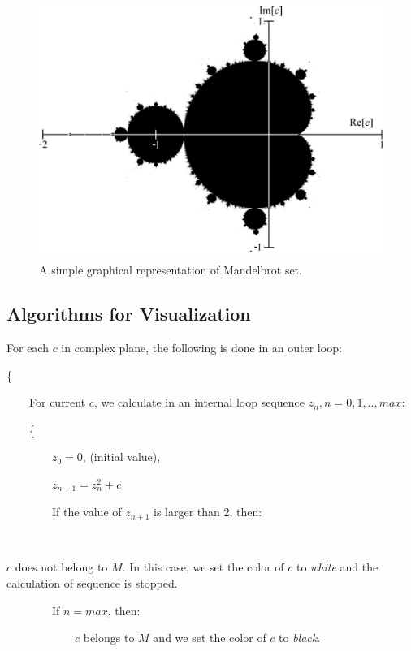 \begin{figure}[th]
\centering
\includegraphics[width=\textwidth,keepaspectratio]{Figures/Chapter2/mandelbrot.png}
\decoRule
\caption[Mandelbrot Set Graphical Presentation]{A simple graphical representation of Mandelbrot set.}
\label{fig:mandelbrot}
\end{figure}

\subsection*{Algorithms for Visualization}\label{chap2:algorithmsforvisualization}

For each $c$ in complex plane, the following is done in an outer loop:

\{

~~~~For current $c$, we calculate in an internal loop sequence $z_n, n = 0, 1, .., max$:

~~~~\{

~~~~~~~~$z_0 = 0$, (initial value),

~~~~~~~~$z_{n+1} = z_n^2 + c$

~~~~~~~~If the value of $z_{n+1}$ is larger than $2$, then:

~~~~~~~~~~~~\begin{minipage}[t]{0.9\textwidth} $c$ does not belong to $M$. In this case, we set the color of $c$ to \emph{white} and the calculation of sequence is stopped. \end{minipage}

~~~~~~~~If $n = max$, then:

~~~~~~~~~~~~$c$ belongs to $M$ and we set the color of $c$ to \emph{black}.

